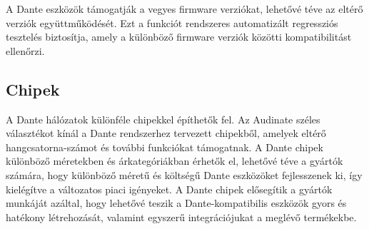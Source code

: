 A Dante eszközök támogatják a vegyes firmware verziókat, lehetővé téve az eltérő 
verziók együttműködését. Ezt a funkciót rendszeres automatizált regressziós tesztelés 
biztosítja, amely a különböző firmware verziók közötti kompatibilitást ellenőrzi.
\subsection{Chipek}
A Dante hálózatok különféle chipekkel építhetők fel. Az Audinate széles választékot 
kínál a Dante rendszerhez tervezett chipekből, amelyek eltérő hangcsatorna-számot 
és további funkciókat támogatnak. A Dante chipek különböző méretekben és árkategóriákban 
érhetők el, lehetővé téve a gyártók számára, hogy különböző méretű és költségű Dante 
eszközöket fejlesszenek ki, így kielégítve a változatos piaci igényeket. A Dante chipek 
elősegítik a gyártók munkáját azáltal, hogy lehetővé teszik a Dante-kompatibilis eszközök 
gyors és hatékony létrehozását, valamint egyszerű integrációjukat a meglévő termékekbe.
